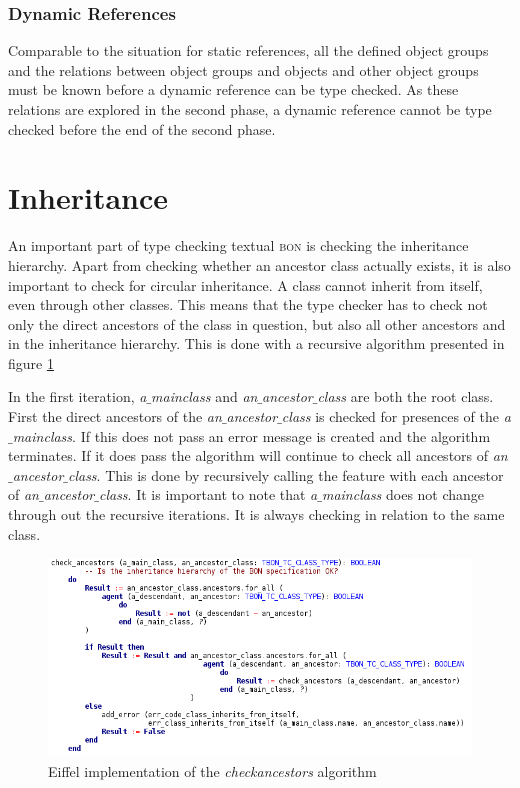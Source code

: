 \subsubsection{Dynamic References}%
Comparable to the situation for static references, all the defined object groups and the relations between object groups and objects and other object groups must be known before a dynamic reference can be type checked. As these relations are explored in the second phase, a dynamic reference cannot be type checked before the end of the second phase.

\section{Inheritance}
An important part of type checking textual \textsc{bon} is checking the inheritance hierarchy. Apart from checking whether an ancestor class actually exists, it is also important to check for circular inheritance. A class cannot inherit from itself, even through other classes. This means that the type checker has to check not only the direct ancestors of the class in question, but also all other ancestors and in the inheritance hierarchy. This is done with a recursive algorithm presented in figure \ref{fig:eiffel_check_ancestors}

In the first iteration, \textit{a$\_$main}\textunderscore\textit{class} and \textit{an$\_$ancestor$\_$class} are both the root class. First the direct ancestors of the \textit{an$\_$ancestor$\_$class}   is checked for presences of the \textit{a$\_$main}\textunderscore\textit{class}. If this does not pass an error message is created and the algorithm terminates. If it does pass the algorithm will continue to check all ancestors of \textit{an$\_$ancestor$\_$class}. This is done by recursively calling the feature with each ancestor of \textit{an$\_$ancestor$\_$class}. It is important to note that \textit{a$\_$main}\textunderscore\textit{class} does not change through out the recursive iterations. It is always checking in relation to the same class.

\begin{figure}
\centerline{
\includegraphics[scale=0.7]{images/check_ancestors_eiffel_code.png}
}
\caption{Eiffel implementation of the \textit{check}\textunderscore\textit{ancestors} algorithm}
\label{fig:eiffel_check_ancestors}
\end{figure}

